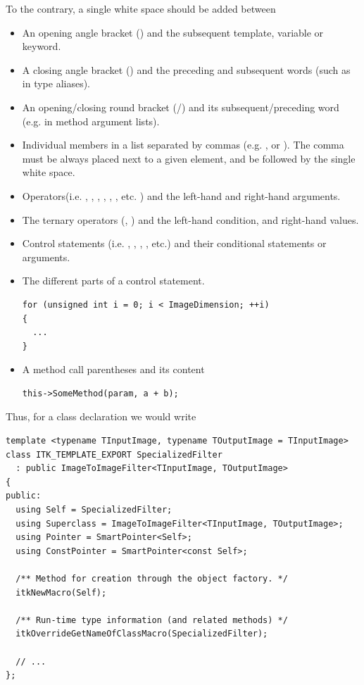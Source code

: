 To the contrary, a single white space should be added between
\begin{itemize}
\item An opening angle bracket (\code{<}) and the subsequent template,
variable or keyword.
\item A closing angle bracket (\code{>}) and the preceding and subsequent
words (such as in type aliases).
\item An opening/closing round bracket (\code{(}/\code{)}) and its
subsequent/preceding word (e.g. in method argument lists).
\item Individual members in a list separated by commas (e.g.
, or ). The comma must be
always placed next to a given element, and be followed by the single white space.
\item Operators(i.e. \code{+}, \code{-}, \code{=}, \code{==}, \code{+=},
\code{<<}, etc. ) and the left-hand and right-hand arguments.
\item The ternary operators (, \code{:}) and the left-hand condition,
and right-hand values.
\item Control statements (i.e. , , ,
, etc.) and their conditional statements or arguments.
\item The different parts of a  control statement.

\small
\begin{verbatim}
for (unsigned int i = 0; i < ImageDimension; ++i)
{
  ...
}
\end{verbatim}
\normalsize

\item A method call parentheses and its content

\small
\begin{verbatim}
this->SomeMethod(param, a + b);
\end{verbatim}
\normalsize

\end{itemize}

Thus, for a class declaration we would write

\small
\begin{verbatim}
template <typename TInputImage, typename TOutputImage = TInputImage>
class ITK_TEMPLATE_EXPORT SpecializedFilter
  : public ImageToImageFilter<TInputImage, TOutputImage>
{
public:
  using Self = SpecializedFilter;
  using Superclass = ImageToImageFilter<TInputImage, TOutputImage>;
  using Pointer = SmartPointer<Self>;
  using ConstPointer = SmartPointer<const Self>;

  /** Method for creation through the object factory. */
  itkNewMacro(Self);

  /** Run-time type information (and related methods) */
  itkOverrideGetNameOfClassMacro(SpecializedFilter);

  // ...
};
\end{verbatim}
\normalsize

